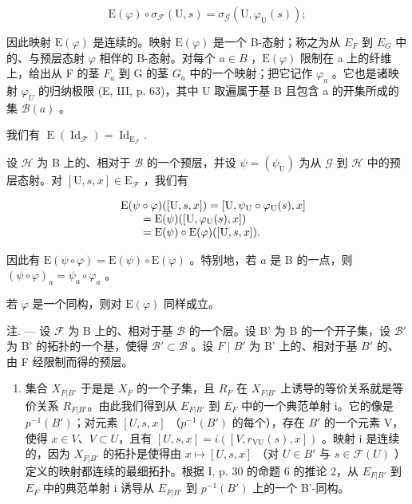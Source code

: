 \[
\mathrm{E} (\varphi) \circ \sigma_ {\mathcal {F}} (\mathrm{U}, s) = \sigma_ {\mathcal {G}} (\mathrm{U}, \varphi_ {\mathrm{U}} (s));
\]

因此映射 \(\mathrm{E}(\varphi)\) 是连续的。映射 \(\mathrm{E}(\varphi)\) 是一个 B-态射；称之为从 \(E_{F}\) 到 \(E_{G}\) 中的、与预层态射 \(\varphi\) 相伴的 B-态射。对每个 \(a \in B\) ，\(\mathrm{E}(\varphi)\) 限制在 a 上的纤维上，给出从 F 的茎 \(F_{a}\) 到 G 的茎 \(G_{a}\) 中的一个映射；把它记作 \(\varphi_{a}\) 。它也是诸映射 \(\varphi_{U}\) 的归纳极限 (E, III, p. 63)，其中 U 取遍属于基 B 且包含 a 的开集所成的集 \(\mathcal{B}(a)\) 。

我们有 \(\operatorname{E}(\operatorname{Id}_{\mathcal{F}}) = \operatorname{Id}_{\operatorname{E}_{\mathcal{F}}}.\)

设 \(\mathcal{H}\) 为 B 上的、相对于 \(\mathcal{B}\) 的一个预层，并设 \(\psi = (\psi_{\mathrm{U}})\) 为从 \(\mathcal{G}\) 到 \(\mathcal{H}\) 中的预层态射。对 \([\mathrm{U}, s, x] \in \mathrm{E}_{\mathcal{F}}\) ，我们有

\[
\begin{array}{r l} & {\mathrm{E} (\psi \circ \varphi) ([ \mathrm{U}, s, x ]) = [ \mathrm{U}, \psi_ {\mathrm{U}} \circ \varphi_ {\mathrm{U}} (s), x ]} \\ & {\qquad = \mathrm{E} (\psi) ([ \mathrm{U}, \varphi_ {\mathrm{U}} (s), x ])} \\ & {\qquad = \mathrm{E} (\psi) \circ \mathrm{E} (\varphi) ([ \mathrm{U}, s, x ]).} \end{array}
\]

因此有 \(\mathrm{E}(\psi \circ \varphi) = \mathrm{E}(\psi) \circ \mathrm{E}(\varphi)\) 。特别地，若 \(a\) 是 B 的一点，则 \((\psi \circ \varphi)_a = \psi_a \circ \varphi_a\) 。

若 \(\varphi\) 是一个同构，则对 \(\mathrm{E}(\varphi)\) 同样成立。

注. --- 设 \(\mathcal{F}\) 为 B 上的、相对于基 \(\mathcal{B}\) 的一个层。设 B' 为 B 的一个开子集，设 \(\mathcal{B}'\) 为 B' 的拓扑的一个基，使得 \(\mathcal{B}' \subset \mathcal{B}\) 。设 \(F \mid B'\) 为 B' 上的、相对于基 \(B'\) 的、由 F 经限制而得的预层。

\begin{enumerate}
\def\labelenumi{\arabic{enumi})}
\tightlist
\item
  集合 \(X_{F|B'}\) 于是是 \(X_{F}\) 的一个子集，且 \(R_{F}\) 在 \(X_{F|B'}\) 上诱导的等价关系就是等价关系 \(R_{F|B'}\)。由此我们得到从 \(E_{F|B'}\) 到 \(E_{F}\) 中的一个典范单射 i。它的像是 \(p^{-1}(B')\)；对元素 \([U, s, x]\) （\(p^{-1}(B')\) 的每个），存在 \(B'\) 的一个元素 V，使得 \(x \in V\)、\(V \subset U\)，且有 \([U, s, x] = i([V, r_{\mathrm{VU}}(s), x])\) 。映射 i 是连续的，因为 \(X_{F|B'}\) 的拓扑是使得由 \(x \mapsto [U, s, x]\) （对 \(U \in B'\) 与 \(s \in \mathcal{F}(U)\) ）定义的映射都连续的最细拓扑。根据 I, p. 30 的命题 6 的推论 2，从 \(E_{F|B'}\) 到 \(E_{F}\) 中的典范单射 i 诱导从 \(E_{F|B'}\) 到 \(p^{-1}(B')\) 上的一个 B'-同构。
\end{enumerate}

